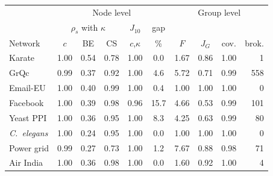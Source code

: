 \setlength{\tabcolsep}{2.6pt}\footnotesize
\begin{tabular}{l ccc c c | ccc r}
\toprule
 & \multicolumn{5}{c|}{Node level} & \multicolumn{4}{c}{Group level}\\
 & \multicolumn{3}{c}{$\rho_s$ with $\kappa$} & $J_{10}$ & gap & & & & \\
Network & $c$ & BE & CS & $c$,$\kappa$ & \% & $F$ & $J_G$ & cov. & brok.\\
\midrule
Karate & 1.00 & 0.54 & 0.78 & 1.00 & 0.0 & 1.67 & 0.86 & 1.00 & 1\\
GrQc & 0.99 & 0.37 & 0.92 & 1.00 & 4.6 & 5.72 & 0.71 & 0.99 & 558\\
Email-EU & 1.00 & 0.40 & 0.99 & 1.00 & 0.4 & 1.00 & 1.00 & 1.00 & 0\\
Facebook & 1.00 & 0.39 & 0.98 & 0.96 & 15.7 & 4.66 & 0.53 & 0.99 & 101\\
\midrule
Yeast PPI & 1.00 & 0.36 & 0.95 & 1.00 & 8.3 & 4.25 & 0.63 & 0.99 & 80\\
\emph{C.~elegans} & 1.00 & 0.24 & 0.95 & 1.00 & 0.0 & 1.00 & 1.00 & 1.00 & 0\\
\midrule
Power grid & 0.99 & 0.27 & 0.73 & 1.00 & 1.2 & 7.67 & 0.88 & 0.98 & 71\\
Air India & 1.00 & 0.36 & 0.98 & 1.00 & 0.0 & 1.60 & 0.92 & 1.00 & 4\\
\bottomrule
\end{tabular}